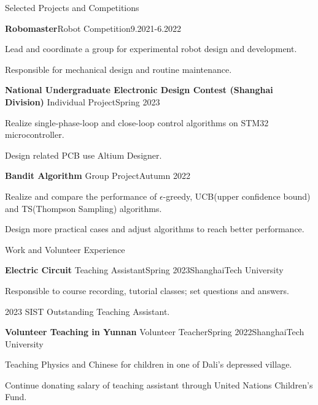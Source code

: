 \documentclass[]{ZhongtaoGuan-resume}
\begin{document}
\begin{section}{Selected Projects and Competitions} 
 \begin{subsection}{\textbf{Robomaster}}{Robot Competition}{9.2021-6.2022}{}
     \item{Lead and coordinate a group for experimental robot design and development.}
     \item{Responsible for mechanical design and routine maintenance.}

 \end{subsection}
 \begin{subsection}{\textbf{National Undergraduate Electronic Design Contest (Shanghai Division)}}
     {Individual Project}{Spring 2023}{}
     \item{Realize single-phase-loop and close-loop control algorithms on STM32 microcontroller.}
     \item{Design related PCB use Altium Designer.}
 \end{subsection}
 \begin{subsection}{\textbf{Bandit Algorithm}}
     {Group Project}{Autumn 2022}{}
     \item{Realize and compare the performance of $\epsilon$-greedy, UCB(upper confidence bound) and TS(Thompson Sampling) algorithms.}
     \item{ Design more practical cases and adjust algorithms to reach better performance.}
 \end{subsection}
\end{section}

\newpage

\begin{section}{Work and Volunteer Experience}
 \begin{subsection}{\textbf{Electric Circuit}}
     {Teaching Assistant}{Spring 2023}{ShanghaiTech University}
     \item{Responsible to course recording, tutorial classes; set questions and answers.}
     \item{2023 SIST Outstanding Teaching Assistant.}
 \end{subsection}
 \begin{subsection}{\textbf{Volunteer Teaching in Yunnan}}
     {Volunteer Teacher}{Spring 2022}{ShanghaiTech University}
     \item{Teaching Physics and Chinese for children in one of Dali's depressed village.}
     \item{Continue donating salary of teaching assistant through United Nations Children's Fund.}
 \end{subsection}
\end{section}
\end{document}

